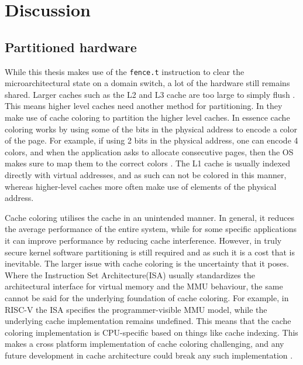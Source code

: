 \section{Discussion}\label{sec:discussion} %

\subsection{Partitioned hardware}\label{sec:hardware}
While this thesis makes use of the \texttt{fence.t} instruction to clear the
microarchitectural state on a domain switch, a lot of the hardware still remains
shared. Larger caches such as the L2 and L3 cache are too large to simply
flush \cite{wistoff2023}. This means higher level caches need another method for
partitioning. In \cite{ge2019} they make use of cache coloring to partition the
higher level caches. In essence cache coloring works by using some of the bits
in the physical address to encode a color of the page. For example, if using 2
bits in the physical address, one can encode 4 colors, and when the application
asks to allocate consecutive pages, then the OS makes sure to map them to the
correct colors \cite{dinh, WhatCacheColoring}. The L1 cache is usually indexed
directly with virtual addresses, and as such can not be colored in this manner,
whereas higher-level caches more often make use of elements of the physical
address.

Cache coloring utilises the cache in an unintended manner. In general, it
reduces the average performance of the entire system, while for some specific
applications it can improve performance by reducing cache interference.
However, in truly secure kernel software partitioning is still required and as
such it is a cost that is inevitable. The larger issue with cache coloring is
the uncertainty that it poses. Where the Instruction Set Architecture(ISA)
usually standardizes the architectural interface for virtual memory and the MMU
behaviour, the same cannot be said for the underlying foundation of cache
coloring. For example, in RISC-V the ISA specifies the programmer-visible MMU
model, while the underlying cache implementation remains undefined. This means
that the cache coloring implementation is CPU-specific based on things like
cache indexing. This makes a cross platform implementation of cache coloring
challenging, and any future development in cache architecture could break any
such implementation \cite{WhatCacheColoring}.

